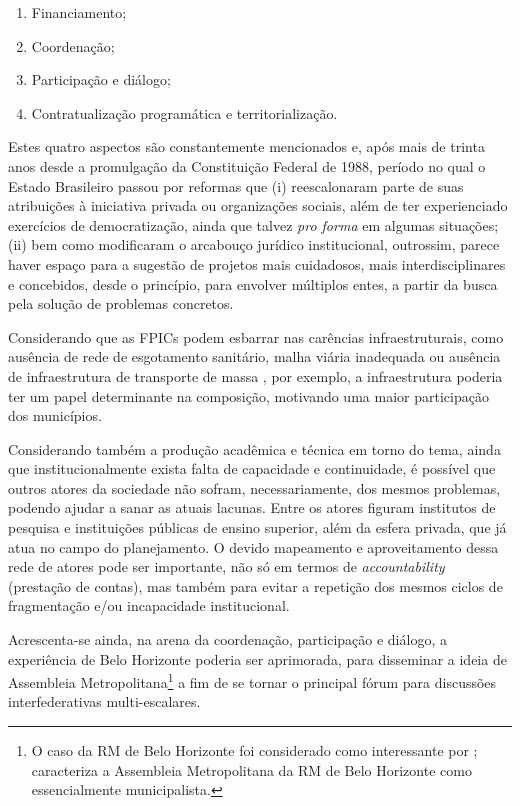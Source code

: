\documentclass[
article,			%
11pt,				%
oneside,			%
a4paper,			%
english,			%
brazil,				%
sumario=tradicional
]{abntex2}
\begin{document}
	\begin{enumerate}
		\item Financiamento;
		\item Coordenação;
		\item Participação e diálogo;
		\item Contratualização programática e territorialização.
	\end{enumerate}

	Estes quatro aspectos são constantemente mencionados e, após mais de trinta anos desde a promulgação da Constituição Federal de 1988, período no qual o Estado Brasileiro passou por reformas que (i) reescalonaram parte de suas atribuições à iniciativa privada ou organizações sociais, além de ter experienciado exercícios de democratização, ainda que talvez \textit{pro forma} em algumas situações; (ii) bem como modificaram o arcabouço jurídico institucional, outrossim, parece haver espaço para a sugestão de projetos mais cuidadosos, mais interdisciplinares e concebidos, desde o princípio, para envolver múltiplos entes, a partir da busca pela solução de problemas concretos.
	
	Considerando que as FPICs podem esbarrar nas carências infraestruturais, como ausência de rede de esgotamento sanitário, malha viária inadequada ou ausência de infraestrutura de transporte de massa \cite[p. 50--56]{mundial2015a}, por exemplo, a infraestrutura poderia ter um papel determinante na composição, motivando uma maior participação dos municípios.
	
	Considerando também a produção acadêmica e técnica em torno do tema, ainda que institucionalmente exista falta de capacidade e continuidade, é possível que outros atores da sociedade não sofram, necessariamente, dos mesmos problemas, podendo ajudar a sanar as atuais lacunas. Entre os atores figuram institutos de pesquisa e instituições públicas de ensino superior, além da esfera privada, que já atua no campo do planejamento. O devido mapeamento e aproveitamento dessa rede de atores pode ser importante, não só em termos de \textit{accountability} (prestação de contas), mas também para evitar a repetição dos mesmos ciclos de fragmentação e/ou incapacidade institucional.
	
	Acrescenta-se ainda, na arena da coordenação, participação e diálogo, a experiência de Belo Horizonte poderia ser aprimorada, para disseminar a ideia de Assembleia Metropolitana\footnote{O caso da RM de Belo Horizonte foi considerado como interessante por ;  caracteriza a Assembleia Metropolitana da RM de Belo Horizonte como essencialmente municipalista.} a fim de se tornar o principal fórum para discussões interfederativas multi-escalares.
	
\end{document}
